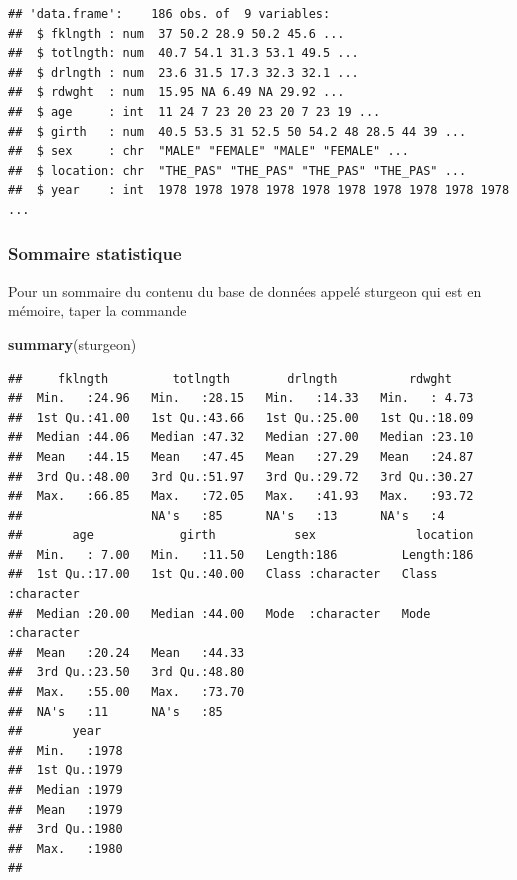 \documentclass[
  12pt,
]{book}
\newenvironment{Shaded}{\begin{snugshade}}{\end{snugshade}}
\newcommand{\KeywordTok}[1]{\textcolor[rgb]{0.13,0.29,0.53}{\textbf{#1}}}
\newcommand{\NormalTok}[1]{#1}
\begin{document}
\begin{verbatim}
## 'data.frame':    186 obs. of  9 variables:
##  $ fklngth : num  37 50.2 28.9 50.2 45.6 ...
##  $ totlngth: num  40.7 54.1 31.3 53.1 49.5 ...
##  $ drlngth : num  23.6 31.5 17.3 32.3 32.1 ...
##  $ rdwght  : num  15.95 NA 6.49 NA 29.92 ...
##  $ age     : int  11 24 7 23 20 23 20 7 23 19 ...
##  $ girth   : num  40.5 53.5 31 52.5 50 54.2 48 28.5 44 39 ...
##  $ sex     : chr  "MALE" "FEMALE" "MALE" "FEMALE" ...
##  $ location: chr  "THE_PAS" "THE_PAS" "THE_PAS" "THE_PAS" ...
##  $ year    : int  1978 1978 1978 1978 1978 1978 1978 1978 1978 1978 ...
\end{verbatim}

\hypertarget{sommaire-statistique}{%
\subsubsection{Sommaire statistique}\label{sommaire-statistique}}

Pour un sommaire du contenu du base de données appelé sturgeon qui est en mémoire, taper la commande

\begin{Shaded}
\begin{Highlighting}[]
\KeywordTok{summary}\NormalTok{(sturgeon)}
\end{Highlighting}
\end{Shaded}

\begin{verbatim}
##     fklngth         totlngth        drlngth          rdwght     
##  Min.   :24.96   Min.   :28.15   Min.   :14.33   Min.   : 4.73  
##  1st Qu.:41.00   1st Qu.:43.66   1st Qu.:25.00   1st Qu.:18.09  
##  Median :44.06   Median :47.32   Median :27.00   Median :23.10  
##  Mean   :44.15   Mean   :47.45   Mean   :27.29   Mean   :24.87  
##  3rd Qu.:48.00   3rd Qu.:51.97   3rd Qu.:29.72   3rd Qu.:30.27  
##  Max.   :66.85   Max.   :72.05   Max.   :41.93   Max.   :93.72  
##                  NA's   :85      NA's   :13      NA's   :4      
##       age            girth           sex              location        
##  Min.   : 7.00   Min.   :11.50   Length:186         Length:186        
##  1st Qu.:17.00   1st Qu.:40.00   Class :character   Class :character  
##  Median :20.00   Median :44.00   Mode  :character   Mode  :character  
##  Mean   :20.24   Mean   :44.33                                        
##  3rd Qu.:23.50   3rd Qu.:48.80                                        
##  Max.   :55.00   Max.   :73.70                                        
##  NA's   :11      NA's   :85                                           
##       year     
##  Min.   :1978  
##  1st Qu.:1979  
##  Median :1979  
##  Mean   :1979  
##  3rd Qu.:1980  
##  Max.   :1980  
## 
\end{verbatim}
\end{document}
